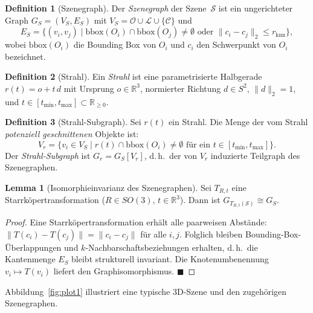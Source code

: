 ﻿\documentclass[a4paper,12pt]{article}
\theoremstyle{definition}
\newtheorem{definition}{Definition}[section]
\newtheorem{lemma}{Lemma}[section]
\begin{document}
\begin{definition}[Szenegraph]
  \label{def:szenegraph}
  Der \emph{Szenegraph} der Szene~$\mathcal{S}$ ist ein ungerichteter
  Graph $G_S = (V_S, E_S)$ mit
  $V_S = \mathcal{O} \cup \mathcal{L} \cup \{\mathcal{C}\}$ und
  \[
    E_S = \bigl\{(v_i, v_j) \;\big|\;
    \mathrm{bbox}(O_i) \cap \mathrm{bbox}(O_j) \neq \emptyset
    \text{ oder } \|c_i - c_j\|_2 \leq r_{\mathrm{knn}}\bigr\},
  \]
  wobei $\mathrm{bbox}(O_i)$ die Bounding Box von $O_i$ und $c_i$
  den Schwerpunkt von $O_i$ bezeichnet.
\end{definition}

\begin{definition}[Strahl]
  \label{def:strahl}
  Ein \emph{Strahl} ist eine parametrisierte Halbgerade
  $r(t) = o + t\,d$ mit Ursprung $o \in \mathbb{R}^3$,
  normierter Richtung $d \in S^2$, $\|d\|_2 = 1$, und
  $t \in [t_{\min}, t_{\max}] \subset \mathbb{R}_{\geq 0}$.
\end{definition}

\begin{definition}[Strahl-Subgraph]
  \label{def:strahl_subgraph}
  Sei $r(t)$ ein Strahl. Die Menge der vom Strahl
  \emph{potenziell geschnittenen} Objekte ist:
  \[
    V_r = \bigl\{v_i \in V_S \;\big|\;
    r(t) \cap \mathrm{bbox}(O_i) \neq \emptyset
    \text{ für ein } t \in [t_{\min}, t_{\max}]\bigr\}.
  \]
  Der \emph{Strahl-Subgraph} ist $G_r = G_S[V_r]$, d.\,h.\ der von
  $V_r$ induzierte Teilgraph des Szenegraphen.
\end{definition}

\begin{lemma}[Isomorphieinvarianz des Szenegraphen]
  \label{lem:szene_invarianz}
  Sei $T_{R,t}$ eine Starrköpertransformation
  ($R \in SO(3)$, $t \in \mathbb{R}^3$). Dann ist
  $G_{T_{R,t}(\mathcal{S})} \cong G_S$.
\end{lemma}

\begin{proof}
  Eine Starrköpertransformation erhält alle paarweisen Abstände:
  $\|T(c_i) - T(c_j)\| = \|c_i - c_j\|$ für alle $i, j$.
  Folglich bleiben Bounding-Box-Überlappungen und
  $k$-Nachbarschaftsbeziehungen erhalten, d.\,h.\ die Kantenmenge
  $E_S$ bleibt strukturell invariant. Die Knotenumbenennung
  $v_i \mapsto T(v_i)$ liefert den Graphisomorphismus.
  \hfill$\blacksquare$
\end{proof}

Abbildung~\ref{fig:plot1} illustriert eine typische 3D-Szene und
den zugehörigen Szenegraphen.
\end{document}
